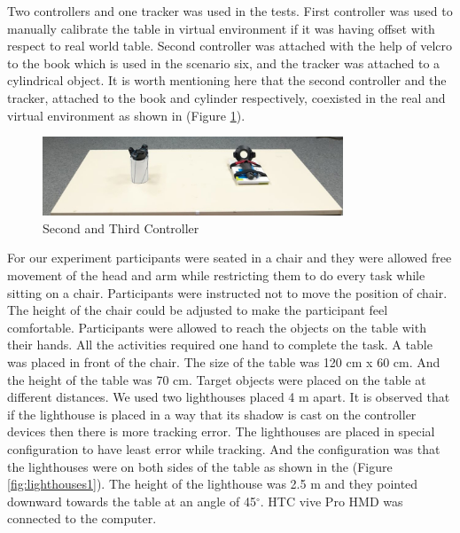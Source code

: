 Two controllers and one tracker was used in the tests. First controller was used to manually calibrate the table in virtual environment if it was having offset with respect to real world table. Second controller was attached with the help of velcro to the book which is used in the scenario six, and the tracker was attached to a cylindrical object. It is worth mentioning here that the second controller and the tracker, attached to the book and cylinder respectively, coexisted in the real and virtual environment as shown in (Figure \ref{fig:tracker11}).\par   
\begin{figure}[h]
    \centering
    \includegraphics[width=0.8\textwidth]{./images/tracker11.jpg}
    \caption{Second and Third Controller}
    \label{fig:tracker11}
\end{figure}

For our experiment participants were seated in a chair and they were allowed free movement of the head and arm while restricting them to do every task while sitting on a chair. Participants were instructed not to move the position of chair. The height of the chair could be adjusted to make the participant feel comfortable. Participants were allowed to reach the objects on the table with their hands. All the activities required one hand to complete the task.
A table was placed in front of the chair. The size of the table was 120 cm x 60 cm. And the height of the table was 70 cm. Target objects were placed on the table at different distances. 
We used two lighthouses placed 4 m apart. It is observed that if the lighthouse is placed in a way that its shadow is cast on the controller devices then there is more tracking error. The lighthouses are placed in special configuration to have least error while tracking. And the configuration was that the lighthouses were on both sides of the table as shown in the (Figure \ref{fig:lighthouses1}). The height of the lighthouse was 2.5 m and they pointed downward towards the table at an angle of 45$^{\circ}$.
HTC vive Pro HMD was connected to the computer. 

